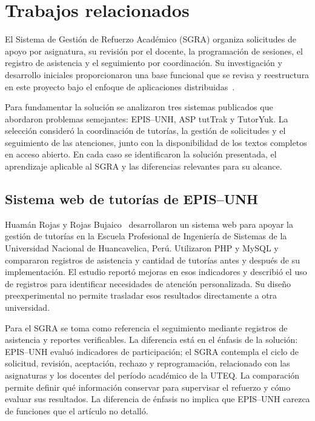 \section{Trabajos relacionados}

El Sistema de Gestión de Refuerzo Académico (SGRA) organiza solicitudes de apoyo por asignatura, su revisión por el docente, la programación de sesiones, el registro de asistencia y el seguimiento por coordinación. Su investigación y desarrollo iniciales proporcionaron una base funcional que se revisa y reestructura en este proyecto bajo el enfoque de aplicaciones distribuidas~\cite{SGRA-documentacion-original}.

Para fundamentar la solución se analizaron tres sistemas publicados que abordaron problemas semejantes: EPIS--UNH, ASP tutTrak y TutorYuk. La selección consideró la coordinación de tutorías, la gestión de solicitudes y el seguimiento de las atenciones, junto con la disponibilidad de los textos completos en acceso abierto. En cada caso se identificaron la solución presentada, el aprendizaje aplicable al SGRA y las diferencias relevantes para su alcance.

\subsection{Sistema web de tutorías de EPIS--UNH}

Huamán Rojas y Rojas Bujaico~\cite{Rojas2023} desarrollaron un sistema web para apoyar la gestión de tutorías en la Escuela Profesional de Ingeniería de Sistemas de la Universidad Nacional de Huancavelica, Perú. Utilizaron PHP y MySQL y compararon registros de asistencia y cantidad de tutorías antes y después de su implementación. El estudio reportó mejoras en esos indicadores y describió el uso de registros para identificar necesidades de atención personalizada. Su diseño preexperimental no permite trasladar esos resultados directamente a otra universidad.

Para el SGRA se toma como referencia el seguimiento mediante registros de asistencia y reportes verificables. La diferencia está en el énfasis de la solución: EPIS--UNH evaluó indicadores de participación; el SGRA contempla el ciclo de solicitud, revisión, aceptación, rechazo y reprogramación, relacionado con las asignaturas y los docentes del período académico de la UTEQ. La comparación permite definir qué información conservar para supervisar el refuerzo y cómo evaluar sus resultados. La diferencia de énfasis no implica que EPIS--UNH carezca de funciones que el artículo no detalló.

